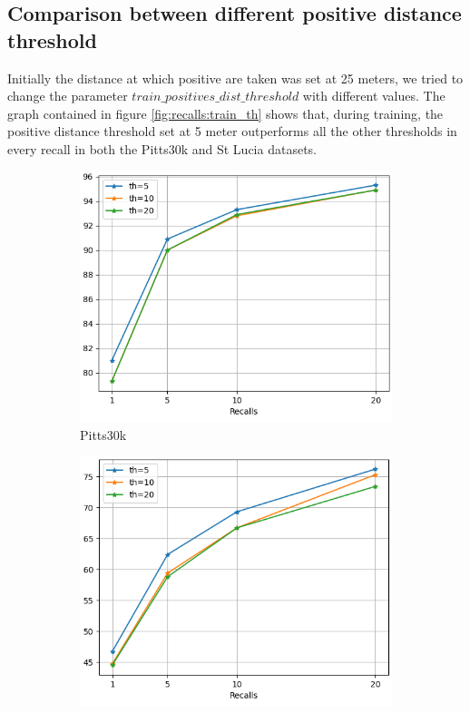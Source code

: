 \documentclass[10pt,twocolumn,letterpaper]{article}
\begin{document}
\subsection{Comparison between different positive distance threshold}
Initially the distance at which positive are taken was set at 25 meters, we tried to change the parameter ${train\_positives\_dist\_threshold}$ with different values. The graph contained in figure \ref{fig:recalls:train_th} shows that, during training, the positive distance threshold set at 5 meter outperforms all the other thresholds in every recall in both the Pitts30k and St Lucia datasets.\\
\begin{figure}
	\centering
	\begin{subfigure}[b]{0.23\textwidth}
		\centering
		\includegraphics[width=\textwidth]{img/train_th/test_pitts30k_recalls_graph.png}
		\caption{Pitts30k}
		\label{fig:recalls:train_th:pitts30k}
	\end{subfigure}
	\hfill
	\begin{subfigure}[b]{0.23\textwidth}
		\centering
		\includegraphics[width=\textwidth]{img/train_th/test_st_lucia_recalls_graph.png}

\end{subfigure}
\end{figure}
\end{document}
